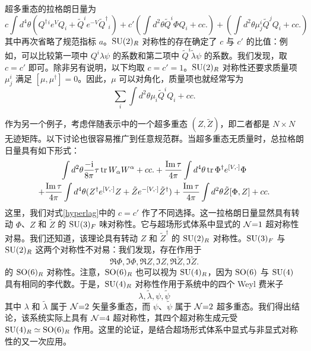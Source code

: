 超多重态的拉格朗日量为
\begin{equation}
c\int d^4\theta (Q^\dagger{}^i e^V Q_i+ \tilde Q^i e^{-V} \tilde Q^\dagger{}_i)
+c'(\int d^2 \theta \tilde Q^i \Phi Q_i + cc.)
+(\int d^2\theta \mu^i_j \tilde Q^jQ_i + cc.)\label{hyperlag}
\end{equation}
其中再次省略了规范指标 $a$。$\mathop{\mathrm{SU}}(2)_R$ 对称性的存在确定了 $c$ 与 $c'$ 的比值：例如，可以比较第一项中 $Q^i\lambda\psi$ 的系数和第二项中 $\tilde Q^i\tilde\lambda\psi$ 的系数。我们发现，取 $c=c'$ 即可。除非另有说明，以下均取 $c=c'=1$。$\mathop{\mathrm{SU}}(2)_R$ 对称性还要求质量项 $\mu^i_j$ 满足 $[\mu,\mu^\dagger]=0$。因此，$\mu$ 可以对角化，质量项也就经常写为
\begin{equation}
\sum_i \int d^2\theta \mu_i \tilde Q^i Q_i + cc.
\end{equation}

作为另一个例子，考虑伴随表示中的一个超多重态 $(Z,\tilde Z)$，即二者都是 $N\times N$ 无迹矩阵。以下讨论也很容易推广到任意规范群。当超多重态无质量时，总拉格朗日量具有如下形式：
\begin{multline}
\int d^2\theta \frac{-\mathrm{i}}{8\pi}\tau \mathop{\mathrm{tr}}\nolimits W_\alpha W^\alpha + cc.
+\frac{\mathop{\mathrm{Im}}\tau}{4\pi} \int d^4\theta \mathop{\mathrm{tr}}\nolimits \Phi^\dagger e^{[V,\cdot]} \Phi \\
+\frac{\mathop{\mathrm{Im}}\tau}{4\pi} \int d^4\theta (Z^\dagger{} e^{[V,\cdot]} Z+ \tilde Z e^{-[V,\cdot]} \tilde Z^\dagger{})
+\frac{\mathop{\mathrm{Im}}\tau}{4\pi} \int d^2 \theta \tilde Z [\Phi, Z] + cc.\label{n4lag}
\end{multline}
这里，我们对式\eqref{hyperlag}中的 $c=c'$ 作了不同选择。这一拉格朗日量显然具有转动 $\Phi$、$Z$ 和 $\tilde Z$ 的 $\mathop{\mathrm{SU}}(3)_F$ 味对称性。它与超场形式体系中显式的 $\mathcal{N}{=}1$ 超对称性对易。我们还知道，该理论具有转动 $Z$ 和 $\tilde Z^\dagger$ 的 $\mathop{\mathrm{SU}}(2)_R$ 对称性。$\mathop{\mathrm{SU}}(3)_F$ 与 $\mathop{\mathrm{SU}}(2)_R$ 这两个对称性不对易：我们发现，存在作用于
\begin{equation}
\Re \Phi, \Im \Phi, \Re Z, \Im Z, \Re \tilde Z, \Im \tilde Z.
\end{equation}
的 $\mathop{\mathrm{SO}}(6)_R$ 对称性。注意，$\mathop{\mathrm{SO}}(6)_R$ 也可以视为 $\mathop{\mathrm{SU}}(4)_R$，因为 $\mathop{\mathrm{SO}}(6)$ 与 $\mathop{\mathrm{SU}}(4)$ 具有相同的李代数。于是，$\mathop{\mathrm{SU}}(4)_R$ 对称性作用于系统中的四个 Weyl 费米子
\begin{equation}
\lambda, \tilde\lambda, \psi, \tilde \psi
\end{equation}
其中 $\lambda$ 和 $\tilde\lambda$ 属于 $\mathcal{N}{=}2$ 矢量多重态，而 $\psi$、$\tilde\psi$ 属于 $\mathcal{N}{=}2$ 超多重态。我们得出结论，该系统实际上具有 $\mathcal{N}{=}4$ 超对称性，其四个超对称生成元受 $\mathop{\mathrm{SU}}(4)_R\simeq\mathop{\mathrm{SO}}(6)_R$ 作用。这里的论证，是结合超场形式体系中显式与非显式对称性的又一次应用。

